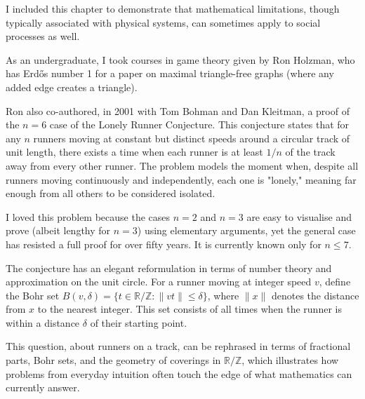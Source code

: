 \begin{commentary}
I included this chapter to demonstrate that mathematical limitations, though typically associated with physical systems, can sometimes apply to social processes as well.

As an undergraduate, I took courses in game theory given by Ron Holzman, who has Erdős number 1 for a paper on maximal triangle-free graphs (where any added edge creates a triangle).

Ron also co-authored, in 2001 with Tom Bohman and Dan Kleitman, a proof of the $n = 6$ case of the Lonely Runner Conjecture. This conjecture states that for any $n$ runners moving at constant but distinct speeds around a circular track of unit length, there exists a time when each runner is at least $1/n$ of the track away from every other runner. The problem models the moment when, despite all runners moving continuously and independently, each one is "lonely," meaning far enough from all others to be considered isolated.

I loved this problem because the cases $n = 2$ and $n = 3$ are easy to visualise and prove (albeit lengthy for $n = 3$) using elementary arguments, yet the general case has resisted a full proof for over fifty years. It is currently known only for $n \leq 7$.

The conjecture has an elegant reformulation in terms of number theory and approximation on the unit circle. For a runner moving at integer speed $v$, define the Bohr set $B(v,\delta) = \{ t \in \mathbb{R}/\mathbb{Z} : \|vt\| \leq \delta \}$, where $\|x\|$ denotes the distance from $x$ to the nearest integer. This set consists of all times when the runner is within a distance $\delta$ of their starting point.

This question, about runners on a track, can be rephrased in terms of fractional parts, Bohr sets, and the geometry of coverings in $\mathbb{R}/\mathbb{Z}$, which illustrates how problems from everyday intuition often touch the edge of what mathematics can currently answer.
\end{commentary}


